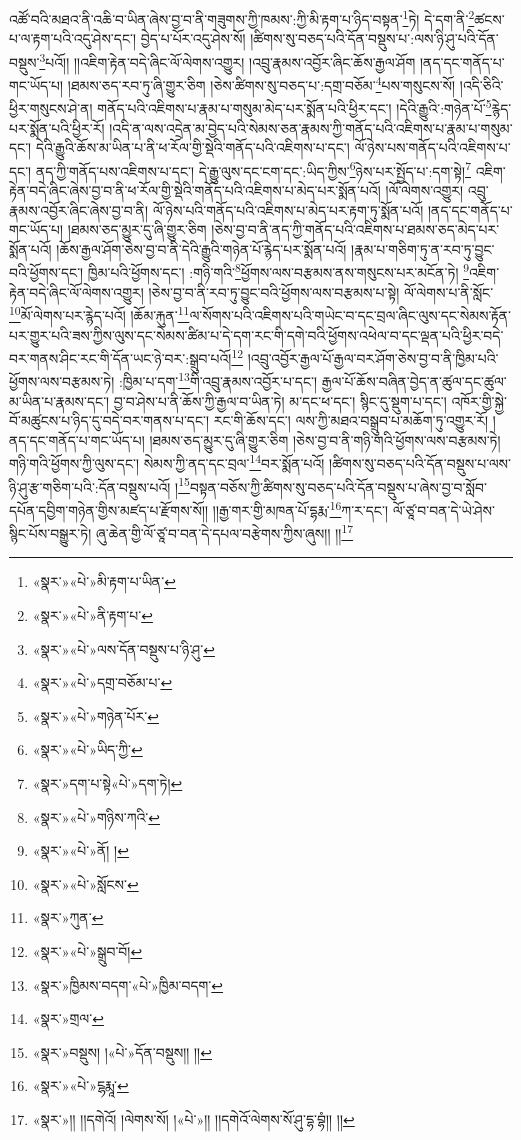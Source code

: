 འཚོ་བའི་མཐའ་ནི་འཆི་བ་ཡིན་ཞེས་བྱ་བ་ནི་གཟུགས་ཀྱི་ཁམས་:ཀྱི་མི་རྟག་པ་ཉིད་བསྟན་\footnote{«སྣར་»«པེ་»མི་རྟག་པ་ཡིན་}ཏེ། དེ་དག་ནི་\footnote{«སྣར་»«པེ་»ནི་རྟག་པ་}ཚངས་པ་ལ་རྟག་པའི་འདུ་ཤེས་དང་། བྱེད་པ་པོར་འདུ་ཤེས་སོ། །ཚིགས་སུ་བཅད་པའི་དོན་བསྡུས་པ་:ལས་ཉི་ཤུ་པའི་དོན་བསྡུས་\footnote{«སྣར་»«པེ་»ལས་དོན་བསྡུས་པ་ཉི་ཤུ་}པའོ།། །།འཇིག་རྟེན་བདེ་ཞིང་ལོ་ལེགས་འགྱུར། །འབྲུ་རྣམས་འབྱོར་ཞིང་ཆོས་རྒྱལ་ཤོག །ནད་དང་གནོད་པ་གང་ཡོད་པ། །ཐམས་ཅད་རབ་ཏུ་ཞི་གྱུར་ཅིག །ཅེས་ཚིགས་སུ་བཅད་པ་:དགྲ་བཅོམ་\footnote{«སྣར་»«པེ་»དགྲ་བཅོམ་པ་}པས་གསུངས་སོ། །འདི་ཅིའི་ཕྱིར་གསུངས་ཤེ་ན། གནོད་པའི་འཇིགས་པ་རྣམ་པ་གསུམ་མེད་པར་སྨོན་པའི་ཕྱིར་དང་། །དེའི་རྒྱུའི་:གཉེན་པོ་\footnote{«སྣར་»«པེ་»གཉེན་པོར་}རྙེད་པར་སྨོན་པའི་ཕྱིར་རོ། །འདི་ན་ལས་འདྲེན་མ་བྱེད་པའི་སེམས་ཅན་རྣམས་ཀྱི་གནོད་པའི་འཇིགས་པ་རྣམ་པ་གསུམ་དང་། དེའི་རྒྱུའི་ཆོས་མ་ཡིན་པ་ནི་ཕ་རོལ་གྱི་སྡེའི་གནོད་པའི་འཇིགས་པ་དང་། ལོ་ཉེས་པས་གནོད་པའི་འཇིགས་པ་དང་། ནད་ཀྱི་གནོད་པས་འཇིགས་པ་དང་། དེ་རྒྱུ་ལུས་དང་ངག་དང་:ཡིད་ཀྱིས་\footnote{«སྣར་»«པེ་»ཡིད་ཀྱི་}ཉེས་པར་སྤྱོད་པ་:དག་སྟེ།\footnote{«སྣར་»དག་པ་སྟེ«པེ་»དག་ཏེ།} འཇིག་རྟེན་བདེ་ཞིང་ཞེས་བྱ་བ་ནི་ཕ་རོལ་གྱི་སྡེའི་གནོད་པའི་འཇིགས་པ་མེད་པར་སྨོན་པའོ། །ལོ་ལེགས་འགྱུར། འབྲུ་རྣམས་འབྱོར་ཞིང་ཞེས་བྱ་བ་ནི། ལོ་ཉེས་པའི་གནོད་པའི་འཇིགས་པ་མེད་པར་རྟག་ཏུ་སྨོན་པའོ། །ནད་དང་གནོད་པ་གང་ཡོད་པ། །ཐམས་ཅད་མྱུར་དུ་ཞི་གྱུར་ཅིག །ཅེས་བྱ་བ་ནི་ནད་ཀྱི་གནོད་པའི་འཇིགས་པ་ཐམས་ཅད་མེད་པར་སྨོན་པའོ། །ཆོས་རྒྱལ་ཤོག་ཅེས་བྱ་བ་ནི་དེའི་རྒྱུའི་གཉེན་པོ་རྙེད་པར་སྨོན་པའོ། །རྣམ་པ་གཅིག་ཏུ་ན་རབ་ཏུ་བྱུང་བའི་ཕྱོགས་དང་། ཁྱིམ་པའི་ཕྱོགས་དང་། :གཉི་གའི་\footnote{«སྣར་»«པེ་»གཉིས་ཀའི་}ཕྱོགས་ལས་བརྩམས་ནས་གསུངས་པར་མངོན་ཏེ། \footnote{«སྣར་»«པེ་»ནོ། ། }འཇིག་རྟེན་བདེ་ཞིང་ལོ་ལེགས་འགྱུར། །ཅེས་བྱ་བ་ནི་རབ་ཏུ་བྱུང་བའི་ཕྱོགས་ལས་བརྩམས་པ་སྟེ། ལོ་ལེགས་པ་ནི་སློང་\footnote{«སྣར་»«པེ་»སློངས་}མོ་ལེགས་པར་རྙེད་པའོ། །ཆོམ་རྐུན་\footnote{«སྣར་»ཀུན་}ལ་སོགས་པའི་འཇིགས་པའི་གཡེང་བ་དང་བྲལ་ཞིང་ལུས་དང་སེམས་རྟོན་པར་གྱུར་པའི་ཟས་ཀྱིས་ལུས་དང་སེམས་ཚིམ་པ་དེ་དག་རང་གི་དགེ་བའི་ཕྱོགས་འཕེལ་བ་དང་ལྡན་པའི་ཕྱིར་བདེ་བར་གནས་ཤིང་རང་གི་དོན་ཡང་ཉེ་བར་:སྒྲུབ་པའོ།\footnote{«སྣར་»«པེ་»སྒྲུབ་བོ།} །འབྲུ་འབྱོར་རྒྱལ་པོ་རྒྱལ་བར་ཤོག་ཅེས་བྱ་བ་ནི་ཁྱིམ་པའི་ཕྱོགས་ལས་བརྩམས་ཏེ། :ཁྱིམ་པ་དག་\footnote{«སྣར་»ཁྱིམས་བདག་«པེ་»ཁྱིམ་བདག་}གི་འབྲུ་རྣམས་འབྱོར་པ་དང་། རྒྱལ་པོ་ཆོས་བཞིན་བྱེད་ན་ཚུལ་དང་ཚུལ་མ་ཡིན་པ་རྣམས་དང་། བྱ་བ་ཤེས་པ་ནི་ཆོས་ཀྱི་རྒྱལ་བ་ཡིན་ཏེ། མ་དང་ཕ་དང་། སྙིང་དུ་སྡུག་པ་དང་། འཁོར་གྱི་སྐྱེ་བོ་མཚུངས་པ་ཉིད་དུ་བདེ་བར་གནས་པ་དང་། རང་གི་ཆོས་དང་། ལས་ཀྱི་མཐའ་བསྒྲུབ་པ་མཆོག་ཏུ་འགྱུར་རོ། །ནད་དང་གནོད་པ་གང་ཡོད་པ། །ཐམས་ཅད་མྱུར་དུ་ཞི་གྱུར་ཅིག །ཅེས་བྱ་བ་ནི་གཉི་གའི་ཕྱོགས་ལས་བརྩམས་ཏེ། གཉི་གའི་ཕྱོགས་ཀྱི་ལུས་དང་། སེམས་ཀྱི་ནད་དང་བྲལ་\footnote{«སྣར་»གྲལ་}བར་སྨོན་པའོ། །ཚིགས་སུ་བཅད་པའི་དོན་བསྡུས་པ་ལས་ཉི་ཤུ་རྩ་གཅིག་པའི་:དོན་བསྡུས་པའོ། །\footnote{«སྣར་»བསྡུས། །«པེ་»དོན་བསྡུས།། །།}བསྟན་བཅོས་ཀྱི་ཚིགས་སུ་བཅད་པའི་དོན་བསྡུས་པ་ཞེས་བྱ་བ་སློབ་དཔོན་དབྱིག་གཉེན་གྱིས་མཛད་པ་རྫོགས་སོ།། །།རྒྱ་གར་གྱི་མཁན་པོ་དྷརྨ་\footnote{«སྣར་»«པེ་»ངྷརྨཱ་}ཀ་ར་དང་། ལོ་ཙཱ་བ་བན་དེ་ཡེ་ཤེས་སྙིང་པོས་བསྒྱུར་ཏེ། ཞུ་ཆེན་གྱི་ལོ་ཙཱ་བ་བན་དེ་དཔལ་བརྩེགས་ཀྱིས་ཞུས།། །།\footnote{«སྣར་»།། །།དགེའོ། །ལེགས་སོ། །«པེ་»།། །།དགེའོ་ལེགས་སོ་ཤུ་དྷ་བྷཾ།། །།}